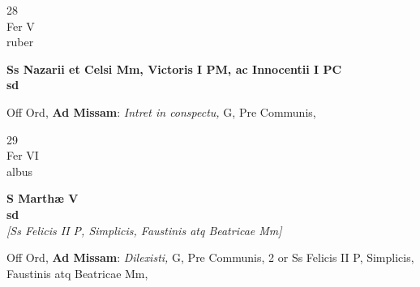 \documentclass[10pt, openany]{book}
\begin{document}
        \begin{center}
            \begin{minipage}{3.5in}
                \vspace{2em}
                \begin{minipage}{0.5in}
                    {\Huge 28} \\
                    {\normalsize Fer V} \\
                    {\normalsize ruber}
                \end{minipage}
                \begin{minipage}{3.0in}
                    \textbf{ \large Ss Nazarii et Celsi Mm, Victoris I PM, ac Innocentii I PC \\
                    \textnormal{\normalsize sd}} \\ 
                \end{minipage}
                \begin{justify}Off Ord, \textbf{Ad Missam}: \textit{Intret in conspectu,} G, Pre Communis,  
                \end{justify}
            \end{minipage}
        \end{center}
    
        \begin{center}
            \begin{minipage}{3.5in}
                \vspace{2em}
                \begin{minipage}{0.5in}
                    {\Huge 29} \\
                    {\normalsize Fer VI} \\
                    {\normalsize albus}
                \end{minipage}
                \begin{minipage}{3.0in}
                    \textbf{ \large S Marthæ V \\
                    \textnormal{\normalsize sd}} \\ \textit{[Ss Felicis II P, Simplicis, Faustinis atq Beatricae Mm]} \\ 
                \end{minipage}
                \begin{justify}Off Ord, \textbf{Ad Missam}: \textit{Dilexisti,} G, Pre Communis, 2 or Ss Felicis II P, Simplicis, Faustinis atq Beatricae Mm,  
                \end{justify}
            \end{minipage}
        \end{center}
    
\end{document}
